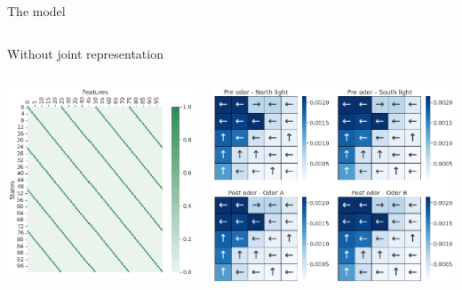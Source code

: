 \documentclass[bigger]{beamer}
\begin{document}
\begin{frame}[label={sec:orgec17ca5}]{The model}
\begin{columns}
\begin{column}{0.5\columnwidth}
\begin{center}
\end{center}
\end{column}
\end{columns}
\end{frame}
\begin{frame}[label={sec:orgddea12c}]{Without joint representation}
\begin{columns}
\begin{column}{0.5\columnwidth}
\begin{center}
\includegraphics[height=0.4\textheight]{img/features-allo-no-joint-repr.png}
\end{center}
\end{column}
\begin{column}{0.5\columnwidth}
\begin{center}
\includegraphics[width=\textwidth]{img/policy-allo-no-joint-repr.png}

\end{center}
\end{column}
\end{columns}
\end{frame}
\end{document}
